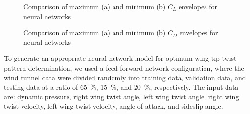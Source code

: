 \documentclass[11pt]{ucthesis}
\begin{document}
\begin{figure}[h!]
\centering
{} 
\caption{Comparison of maximum (a) and minimum (b) $C_L$ envelopes for neural networks}
\label{fig:NNCLMax}
\end{figure}

\begin{figure}[h!]
\centering
{} 
\caption{Comparison of maximum (a) and minimum (b) $C_D$ envelopes for neural networks}
\label{fig:NNCDMax}
\end{figure}

To generate an appropriate neural network model for optimum wing tip twist pattern determination, we used a feed forward network configuration, where the wind tunnel data were divided randomly into training data, validation data, and testing data at a ratio of 65~\%, 15~\%, and 20~\%, respectively. The input data are: dynamic pressure, right wing twist angle, left wing twist angle, right wing twist velocity, left wing twist velocity, angle of attack, and sideslip angle.
\end{document}
